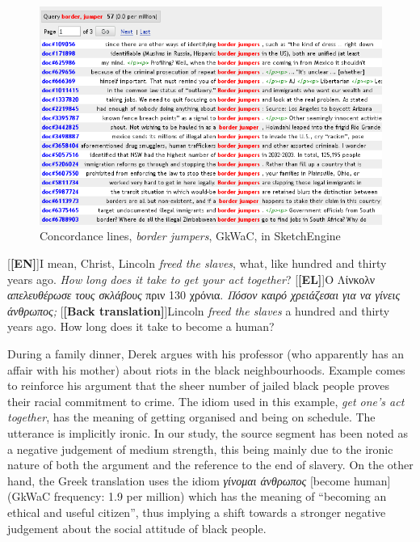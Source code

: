 \documentclass[output=paper]{LSP/langsci}
\begin{document}
\begin{figure}
\includegraphics[width=.9\textwidth]{./figures/4-4.png}
\caption{Concordance lines, \textit{border jumpers}, GkWaC, in SketchEngine} \label{fig:2:5}
\end{figure}

\ea \label{ex:2:22}
\begin{xlist}
\exi{}[\textbf{[EN]}]{I mean, Christ, Lincoln \emph{freed the slaves}, what, like hundred and thirty years ago. \emph{How long does it take to get your act together}?}
\exi{}[\textbf{[EL]}]{Ο Λίνκολν \emph{απελευθέρωσε τους σκλάβους} πριν 130 χρόνια. \emph{Πόσον καιρό χρειάζεσαι για να γίνεις άνθρωπος;}}
\exi{}[\textbf{[Back translation]}]{Lincoln \emph{freed the slaves} a hundred and thirty years ago. How long does it take to become a human?}
\end{xlist}
\z

During a family dinner, Derek argues with his professor (who apparently has an affair with his mother) about riots in the black neighbourhoods. Example  comes to reinforce his argument that the sheer number of jailed black people proves their racial commitment to crime. The idiom used in this example, \textit{get one's act together}, has the meaning of getting organised and being on schedule. The utterance is implicitly ironic. In our study, the source segment has been noted as a negative judgement of medium strength, this being mainly due to the ironic nature of both the argument and the reference to the end of slavery. On the other hand, the Greek translation uses the idiom \textit{γίνομαι άνθρωπος} [become human] (GkWaC frequency: 1.9 per million) which has the meaning of “becoming an ethical and useful citizen”, thus implying a shift towards a stronger negative judgement about the social attitude of black people.\newline
\end{document}
